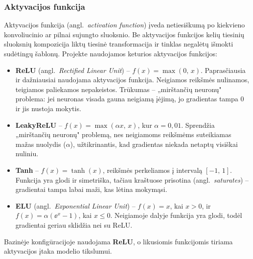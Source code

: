 \subsubsection{Aktyvacijos funkcija}
\label{subsubsec:aktyvacijos_funkcija}

Aktyvacijos funkcija (angl.~\textit{activation function}) įveda netiesiškumą po kiekvieno konvoliucinio ar pilnai sujungto sluoksnio. Be aktyvacijos funkcijos kelių tiesinių sluoksnių kompozicija liktų tiesinė transformacija ir tinklas negalėtų išmokti sudėtingų šablonų. Projekte naudojamos keturios aktyvacijos funkcijos:

\begin{itemize}
    \item \textbf{ReLU} (angl.~\textit{Rectified Linear Unit}) – $f(x) = \max(0,\, x)$. Paprasčiausia ir dažniausiai naudojama aktyvacijos funkcija. Neigiamos reikšmės nulinamos, teigiamos paliekamos nepakeistos. Trūkumas – „mirštančių neuronų" problema: jei neuronas visada gauna neigiamą įėjimą, jo gradientas tampa $0$ ir jis nustoja mokytis.
    \item \textbf{LeakyReLU} – $f(x) = \max(\alpha x,\, x)$, kur $\alpha = 0{,}01$. Sprendžia „mirštančių neuronų" problemą, nes neigiamoms reikšmėms suteikiamas mažas nuolydis ($\alpha$), užtikrinantis, kad gradientas niekada netaptų visiškai nuliniu.
    \item \textbf{Tanh} – $f(x) = \tanh(x)$, reikšmės perkeliamos į intervalą $[-1,\, 1]$. Funkcija yra glodi ir simetriška, tačiau kraštuose prisotina (angl.~\textit{saturates}) – gradientai tampa labai maži, kas lėtina mokymąsi.
    \item \textbf{ELU} (angl.~\textit{Exponential Linear Unit}) – $f(x) = x$, kai $x > 0$, ir $f(x) = \alpha (\ee^{x} - 1)$, kai $x \leq 0$. Neigiamoje dalyje funkcija yra glodi, todėl gradientai geriau sklidžia nei su ReLU.
\end{itemize}

Bazinėje konfigūracijoje naudojama \textbf{ReLU}, o likusiomis funkcijomis tiriama aktyvacijos įtaka modelio tikslumui.
